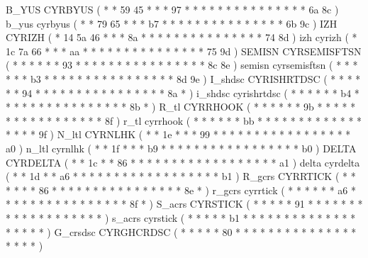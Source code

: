 \makeCOD B_YUS        CYRBYUS           ( *  *       59 45  *  *  *  97    *  *  *  *  *     *  *  *  *     *  *  *     *   *  *    6a 8c  )
\makecod b_yus        cyrbyus           ( *  *       79 65  *  *  *  b7    *  *  *  *  *     *  *  *  *     *  *  *     *   *  *    6b 9c  )
\makeCOD IZH          CYRIZH            ( *  14      5a 46  *  *  *  8a    *  *  *  *  *     *  *  *  *     *  *  *     *   *  *    74 8d  )
\makecod izh          cyrizh            ( *  1c      7a 66  *  *  *  aa    *  *  *  *  *     *  *  *  *     *  *  *     *   *  *    75 9d  )
\makeCOD SEMISN       CYRSEMISFTSN      ( *  *       *  *   *  *  93 *     *  *  *  *  *     *  *  *  *     *  *  *     *   *  *    8c 8e  )
\makecod semisn       cyrsemisftsn      ( *  *       *  *   *  *  b3 *     *  *  *  *  *     *  *  *  *     *  *  *     *   *  *    8d 9e  )
\makeCOD I_shdsc      CYRISHRTDSC       ( *  *       *  *   *  *  94 *     *  *  *  *  *     *  *  *  *     *  *  *     *   *  *    8a *   )
\makecod i_shdsc      cyrishrtdsc       ( *  *       *  *   *  *  b4 *     *  *  *  *  *     *  *  *  *     *  *  *     *   *  *    8b *   )
\makeCOD R_tl         CYRRHOOK          ( *  *       *  *   *  *  9b *     *  *  *  *  *     *  *  *  *     *  *  *     *   *  *    *  8f  )
\makecod r_tl         cyrrhook          ( *  *       *  *   *  *  bb *     *  *  *  *  *     *  *  *  *     *  *  *     *   *  *    *  9f  )
%
\makeCOD N_ltl        CYRNLHK           ( *  *       1e *   *  *  99 *     *  *  *  *  *     *  *  *  *     *  *  *     *   *  *    *  a0  )
\makecod n_ltl        cyrnlhk           ( *  *       1f *   *  *  b9 *     *  *  *  *  *     *  *  *  *     *  *  *     *   *  *    *  b0  )
\makeCOD DELTA        CYRDELTA          ( *  *       1c *   *  86 *  *     *  *  *  *  *     *  *  *  *     *  *  *     *   *  *    *  a1  )
\makecod delta        cyrdelta          ( *  *       1d *   *  a6 *  *     *  *  *  *  *     *  *  *  *     *  *  *     *   *  *    *  b1  )
\makeCOD R_gcrs       CYRRTICK          ( *  *       *  *   *  *  86 *     *  *  *  *  *     *  *  *  *     *  *  *     *   *  *    8e *   )
\makecod r_gcrs       cyrrtick          ( *  *       *  *   *  *  a6 *     *  *  *  *  *     *  *  *  *     *  *  *     *   *  *    8f *   )
\makeCOD S_acrs       CYRSTICK          ( *  *       *  *   *  91 *  *     *  *  *  *  *     *  *  *  *     *  *  *     *   *  *    *  *   )
\makecod s_acrs       cyrstick          ( *  *       *  *   *  b1 *  *     *  *  *  *  *     *  *  *  *     *  *  *     *   *  *    *  *   )
\makeCOD G_crsdsc     CYRGHCRDSC        ( *  *       *  *   *  80 *  *     *  *  *  *  *     *  *  *  *     *  *  *     *   *  *    *  *   )
